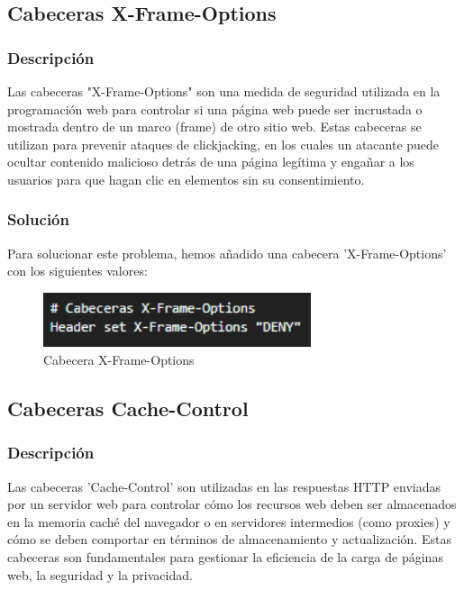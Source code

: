 \documentclass{report}
\begin{document}
            \subsection{Cabeceras X-Frame-Options}
                \subsubsection{Descripción}
                    Las cabeceras "X-Frame-Options" son una medida de seguridad utilizada en la programación web para controlar si una página web puede ser incrustada o mostrada dentro de un marco (frame) de otro sitio web. Estas cabeceras se utilizan para prevenir ataques de clickjacking, en los cuales un atacante puede ocultar contenido malicioso detrás de una página legítima y engañar a los usuarios para que hagan clic en elementos sin su consentimiento.
                \subsubsection{Solución}
                    Para solucionar este problema, hemos añadido una cabecera 'X-Frame-Options' con los siguientes valores:
                    \begin{figure}[H]
                        \centering
                        \includegraphics[width=0.7\textwidth]{./img/vulnerabilidades/3.5.8.1.png}
                        \caption{Cabecera X-Frame-Options}
                    \end{figure}
            \clearpage
            \subsection{Cabeceras Cache-Control}
                \subsubsection{Descripción}
                    Las cabeceras 'Cache-Control' son utilizadas en las respuestas HTTP enviadas por un servidor web para controlar cómo los recursos web deben ser almacenados en la memoria caché del navegador o en servidores intermedios (como proxies) y cómo se deben comportar en términos de almacenamiento y actualización. Estas cabeceras son fundamentales para gestionar la eficiencia de la carga de páginas web, la seguridad y la privacidad.
\end{document}
